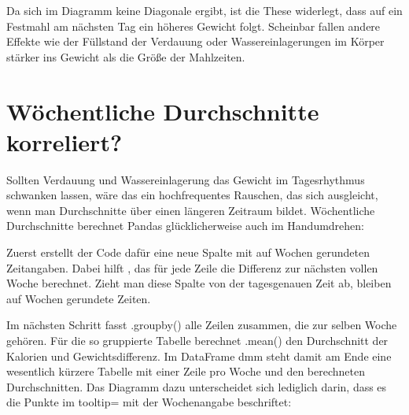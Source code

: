 Da sich im Diagramm keine Diagonale ergibt, ist die These widerlegt, dass auf ein Festmahl am nächsten Tag ein höheres Gewicht folgt. Scheinbar fallen andere Effekte wie der Füllstand der Verdauung oder Wassereinlagerungen im Körper stärker ins Gewicht als die Größe der Mahlzeiten.

\section{Wöchentliche Durchschnitte korreliert?}

Sollten Verdauung und Wassereinlagerung das Gewicht im Tagesrhythmus schwanken lassen, wäre das ein hochfrequentes Rauschen, das sich ausgleicht, wenn man Durchschnitte über einen längeren Zeitraum bildet. Wöchentliche Durchschnitte berechnet Pandas glücklicherweise auch im Handumdrehen:

\medskip





\PYTHON{\qquad \qquad \qquad \qquad as\_index=False)[}


\PYTHON{\qquad \qquad \qquad \qquad ].mean()}

\medskip


Zuerst erstellt der Code dafür eine neue Spalte mit auf Wochen gerundeten Zeitangaben. Dabei hilft , das für jede Zeile die Differenz zur nächsten vollen Woche berechnet. Zieht man diese Spalte von der tagesgenauen Zeit ab, bleiben auf Wochen gerundete Zeiten.

Im nächsten Schritt fasst .groupby() alle Zeilen zusammen, die zur selben Woche gehören. Für die so gruppierte Tabelle berechnet .mean() den Durchschnitt der Kalorien und Gewichtsdifferenz. Im DataFrame dmm steht damit am Ende eine wesentlich kürzere Tabelle mit einer Zeile pro Woche und den berechneten Durchschnitten. Das Diagramm dazu unterscheidet sich lediglich darin, dass es die Punkte im tooltip= mit der Wochenangabe beschriftet:


\medskip




